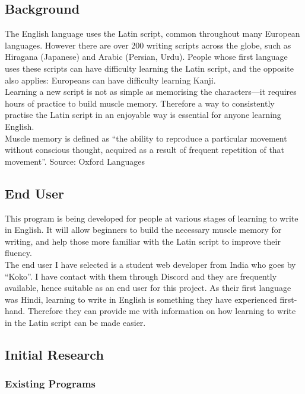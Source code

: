 \documentclass{article}
\begin{document}
\subsection{Background}
The English language uses the Latin script, common throughout many European languages. However there are over 200 writing scripts across the globe, such as Hiragana (Japanese) and Arabic (Persian, Urdu). People whose first language uses these scripts can have difficulty learning the Latin script, and the opposite also applies: Europeans can have difficulty learning Kanji. \\

Learning a new script is not as simple as memorising the characters---it requires hours of practice to build muscle memory. Therefore a way to consistently practise the Latin script in an enjoyable way is essential for anyone learning English. \\

Muscle memory is defined as “the ability to reproduce a particular movement without conscious thought, acquired as a result of frequent repetition of that movement”.	
Source: Oxford Languages

\subsection{End User}
This program is being developed for people at various stages of learning to write in English. It will allow beginners to build the necessary muscle memory for writing, and help those more familiar with the Latin script to improve their fluency. \\

The end user I have selected is a student web developer from India who goes by ``Koko''. I have contact with them through Discord and they are frequently available, hence suitable as an end user for this project. As their first language was Hindi, learning to write in English is something they have experienced first-hand. Therefore they can provide me with information on how learning to write in the Latin script can be made easier.

\newpage
\subsection{Initial Research}

\subsubsection{Existing Programs}
\end{document}
